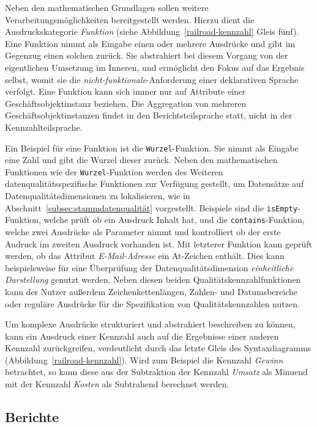 \documentclass[
  language=german, %
  type=bachelor,%
  ngerman
]{isthesis}
\begin{document}
\begin{content}
	Neben den mathematischen Grundlagen sollen weitere Verarbeitungsmöglichkeiten
	bereitgestellt werden. Hierzu dient die Ausdruckskategorie \textit{Funktion}
	(siehe Abbildung~\ref{railroad-kennzahl} Gleis fünf). Eine Funktion nimmt als
	Eingabe einen oder mehrere Ausdrücke und gibt im Gegenzug einen solchen
	zurück. Sie abstrahiert bei diesem Vorgang von der eigentlichen Umsetzung im
	Inneren, und ermöglicht den Fokus auf das Ergebnis selbst, womit sie die
	\textit{nicht-funktionale}-Anforderung einer deklarativen Sprache verfolgt.
	Eine Funktion kann sich immer nur auf Attribute einer Geschäftsobjektinstanz
	beziehen. Die Aggregation von mehreren Geschäftsobjektinstanzen findet in den
	Berichtsteilsprache statt, nicht in der Kennzahlteilsprache.

	Ein Beispiel für eine Funktion ist die \texttt{Wurzel}-Funktion.  Sie nimmt
	als Eingabe eine Zahl und gibt die Wurzel dieser zurück. Neben den
	mathematischen Funktionen wie der \texttt{Wurzel}-Funktion werden des
	Weiteren datenqualitätsspezifische Funktionen zur Verfügung gestellt, um
	Datensätze auf Datenqualitätsdimensionen zu lokalisieren, wie in
	Abschnitt~\ref{subsec:stammdatenqualität} vorgestellt.  Beispiele sind die
	\texttt{isEmpty}-Funktion, welche prüft ob ein Ausdruck Inhalt hat, und die
	\texttt{contains}-Funktion, welche zwei Ausdrücke als Parameter nimmt und
	kontrolliert ob der erste Audruck im zweiten Ausdruck vorhanden ist. Mit
	letzterer Funktion kann \zB{} geprüft werden, ob das Attribut
	\textit{E-Mail-Adresse} ein At-Zeichen enthält. Dies kann beispielsweise für
	eine Überprüfung der Datenqualitätsdimension \textit{einheitliche
	Darstellung} genutzt werden. Neben diesen beiden Qualitätskennzahlfunktionen
	kann der Nutzer außerdem Zeichenkettenlängen, Zahlen- und Datumsbereiche oder
	reguläre Ausdrücke für die Spezifikation von Qualitätskennzahlen nutzen.

  Um komplexe Ausdrücke strukturiert und abstrahiert beschreiben zu können,
  kann ein Ausdruck einer Kennzahl auch auf die Ergebnisse einer anderen
  Kennzahl zurückgreifen, verdeutlicht durch das letzte Gleis des
  Syntaxdiagramms (Abbildung~\ref{railroad-kennzahl}). Wird zum Beispiel die
  Kennzahl \textit{Gewinn} betrachtet, so kann diese aus der Subtraktion der
  Kennzahl \textit{Umsatz} als Minuend mit der Kennzahl \textit{Kosten} als
  Subtrahend berechnet werden.


  \subsection{Berichte}


\end{content}
\end{document}
